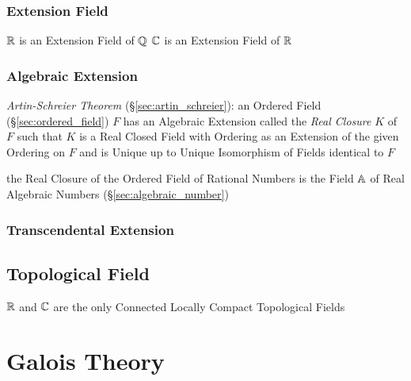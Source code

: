 \subsubsection{Extension Field}\label{sec:extension_field}

$\mathbb{R}$ is an Extension Field of $\mathbb{Q}$
$\mathbb{C}$ is an Extension Field of $\mathbb{R}$



\subsubsection{Algebraic Extension}\label{sec:algebraic_extension}

\emph{Artin-Schreier Theorem} (\S\ref{sec:artin_schreier}): an Ordered Field
(\S\ref{sec:ordered_field}) $F$ has an Algebraic Extension called the
\emph{Real Closure} $K$ of $F$ such that $K$ is a Real Closed Field with
Ordering as an Extension of the given Ordering on $F$ and is Unique up to
Unique Isomorphism of Fields identical to $F$

the Real Closure of the Ordered Field of Rational Numbers is the Field $\mathbb{A}$
of Real Algebraic Numbers (\S\ref{sec:algebraic_number})



\subsubsection{Transcendental Extension}
\label{sec:transcendental_extension}



\subsection{Topological Field}\label{sec:topological_field}

$\mathbb{R}$ and $\mathbb{C}$ are the only Connected Locally Compact
Topological Fields



\section{Galois Theory}\label{sec:galois_theory}


